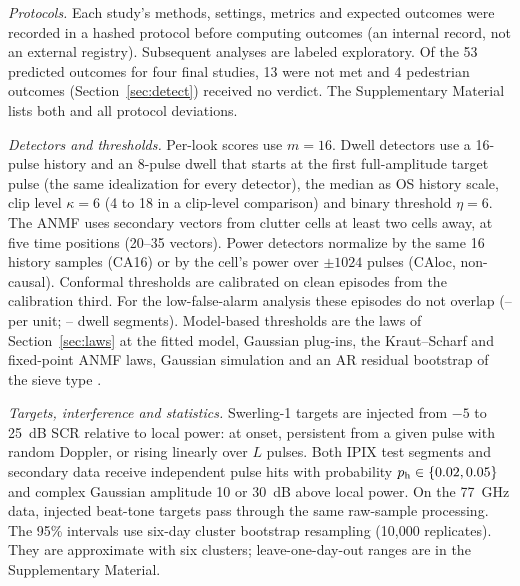 \documentclass[journal]{IEEEtran}
\begin{document}
\emph{Protocols.} Each study's methods, settings, metrics and expected outcomes were recorded in a hashed protocol before computing outcomes (an internal record, not an external registry). Subsequent analyses are labeled exploratory. Of the 53 predicted outcomes for four final studies, 13 were not met and 4 pedestrian outcomes (Section~\ref{sec:detect}) received no verdict. The Supplementary Material lists both and all protocol deviations.

\emph{Detectors and thresholds.} Per-look scores use $m=16$. Dwell detectors use a 16-pulse history and an 8-pulse dwell that starts at the first full-amplitude target pulse (the same idealization for every detector), the median as OS history scale, clip level $\kappa=6$ (4 to 18 in a clip-level comparison) and binary threshold $\eta=6$. The ANMF uses secondary vectors from clutter cells at least two cells away, at five time positions (20--35 vectors). Power detectors normalize by the same 16 history samples (CA16) or by the cell's power over $\pm1024$ pulses (CAloc, non-causal). Conformal thresholds are calibrated on clean episodes from the calibration third. For the low-false-alarm analysis these episodes do not overlap (\LowCalMin--\LowCalMax{} per unit; \DwellCalMin--\DwellCalMax{} dwell segments). Model-based thresholds are the laws of Section~\ref{sec:laws} at the fitted model, Gaussian plug-ins, the Kraut--Scharf and fixed-point ANMF laws, Gaussian simulation and an AR residual bootstrap of the sieve type \cite{qu2024sieve}.

\emph{Targets, interference and statistics.} Swerling-1 targets are injected from $-5$ to 25~dB SCR relative to local power: at onset, persistent from a given pulse with random Doppler, or rising linearly over $L$ pulses. Both IPIX test segments and secondary data receive independent pulse hits with probability $p_{\rm h}\in\{0.02,0.05\}$ and complex Gaussian amplitude 10 or 30~dB above local power. On the 77~GHz data, injected beat-tone targets pass through the same raw-sample processing. The 95\% intervals use six-day cluster bootstrap resampling (10,000 replicates). They are approximate with six clusters; leave-one-day-out ranges are in the Supplementary Material.
\end{document}
